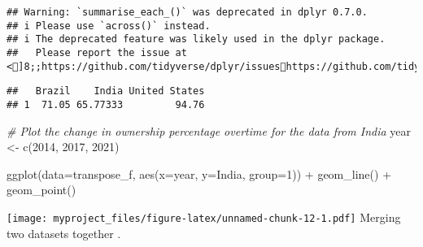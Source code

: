 \documentclass[
]{article}
\newenvironment{Shaded}{\begin{snugshade}}{\end{snugshade}}
\newcommand{\AttributeTok}[1]{\textcolor[rgb]{0.77,0.63,0.00}{#1}}
\newcommand{\CommentTok}[1]{\textcolor[rgb]{0.56,0.35,0.01}{\textit{#1}}}
\newcommand{\DecValTok}[1]{\textcolor[rgb]{0.00,0.00,0.81}{#1}}
\newcommand{\FunctionTok}[1]{\textcolor[rgb]{0.00,0.00,0.00}{#1}}
\newcommand{\NormalTok}[1]{#1}
\newcommand{\OtherTok}[1]{\textcolor[rgb]{0.56,0.35,0.01}{#1}}
\newcommand{\SpecialCharTok}[1]{\textcolor[rgb]{0.00,0.00,0.00}{#1}}
\begin{document}
\begin{verbatim}
## Warning: `summarise_each_()` was deprecated in dplyr 0.7.0.
## i Please use `across()` instead.
## i The deprecated feature was likely used in the dplyr package.
##   Please report the issue at <]8;;https://github.com/tidyverse/dplyr/issueshttps://github.com/tidyverse/dplyr/issues]8;;>.
\end{verbatim}

\begin{verbatim}
##   Brazil    India United States
## 1  71.05 65.77333         94.76
\end{verbatim}

\begin{Shaded}
\begin{Highlighting}[]
\CommentTok{\# Plot the change in ownership percentage overtime for the data from India }
\NormalTok{year }\OtherTok{\textless{}{-}} \FunctionTok{c}\NormalTok{(}\DecValTok{2014}\NormalTok{, }\DecValTok{2017}\NormalTok{, }\DecValTok{2021}\NormalTok{)}

\FunctionTok{ggplot}\NormalTok{(}\AttributeTok{data=}\NormalTok{transpose\_f, }\FunctionTok{aes}\NormalTok{(}\AttributeTok{x=}\NormalTok{year, }\AttributeTok{y=}\NormalTok{India, }\AttributeTok{group=}\DecValTok{1}\NormalTok{)) }\SpecialCharTok{+}
  \FunctionTok{geom\_line}\NormalTok{() }\SpecialCharTok{+}
  \FunctionTok{geom\_point}\NormalTok{()}
\end{Highlighting}
\end{Shaded}

\texttt{[image: myproject\_files/figure-latex/unnamed-chunk-12-1.pdf]}
Merging two datasets together .
\end{document}
